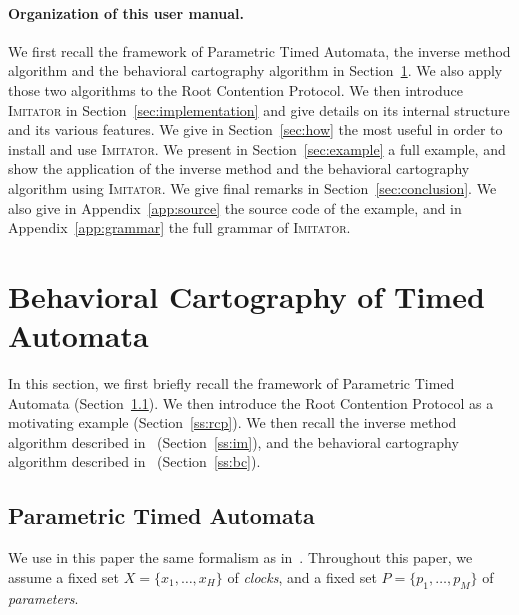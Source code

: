 \documentclass[a4paper,10pt]{article}
\newcommand{\imitator}{\textsc{Imitator}}
\newcommand{\paragraphe}[1]{\paragraph{#1.}}
\begin{document}
\paragraphe{Organization of this user manual}
We first recall the framework of Parametric Timed Automata,
the inverse method algorithm and
the behavioral cartography algorithm in Section~\ref{sec:preliminaries}.
We also apply those two algorithms to the Root Contention Protocol.
We then introduce \imitator{} in Section~\ref{sec:implementation} and give details on its internal structure and its various features.
We give in Section~\ref{sec:how} the most useful in order to install and use \imitator{}.
We present in Section~\ref{sec:example} a full example, and show the application of the inverse method and the behavioral cartography algorithm using \imitator{}.
We give final remarks in Section~\ref{sec:conclusion}.
We also give in Appendix~\ref{app:source} the source code of the example, and in Appendix~\ref{app:grammar} the full grammar of \imitator{}.



\section[Behavioral Cartography]{Behavioral Cartography of Timed Automata} \label{sec:preliminaries}

In this section, we first briefly recall the framework of Parametric Timed Automata (Section~\ref{ss:pta}).
We then introduce the Root Contention Protocol as a motivating example (Section~\ref{ss:rcp}).
We then recall the inverse method algorithm described in~\cite{acef09} (Section~\ref{ss:im}), and
the behavioral cartography algorithm described in~\cite{af10} (Section~\ref{ss:bc}).



\subsection{Parametric Timed Automata} \label{ss:pta}

We use in this paper the same formalism as in~\cite{af10}.
Throughout this paper, we assume a fixed set $X = \{x_1, \dots, x_{H} \}$ of \emph{clocks},
and a fixed set $P = \{p_1, \dots, p_{M} \}$  of \emph{parameters}.
\end{document}
